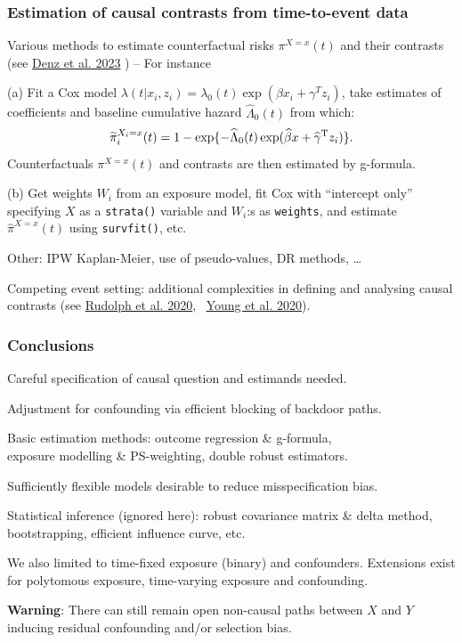 \documentclass[12pt,dvipsnames,t,aspectratio=169, handout%
]{beamer}
\begin{document}
\begin{frame}
\frametitle{\large Estimation of causal contrasts from time-to-event data}
\bi
\item
Various methods to estimate counterfactual %
risks $\pi^{X=x}(t)$ and their contrasts 
({\small see \href{https://doi.org/10.1002/sim.9681}{\color{blue}Denz et al. 2023} })
\pause
 -- For instance
\medskip
\item[(a)] 
Fit a Cox model $\lambda(t|x_i, z_i) = \lambda_0(t)\exp(\beta x_i + \gamma^{T}z_i)$,
take estimates of coefficients and baseline cumulative hazard $\widehat\Lambda_0(t)$
from which:
$$ %
 \widetilde{\pi}_i^{X_i=x}(t) = 1 - \exp \{ -\widehat\Lambda_0(t)\exp(\widehat\beta x + \widehat\gamma^{\small{\text{T}}} z_i) \}  .
$$ %
Counterfactuals $ {\pi}^{X=x}(t)$ and contrasts are then estimated by g-formula.
\pause
\medskip
\item[(b)]
Get weights $W_i$ from an exposure model, fit Cox with ``intercept only'' 
specifying $X$ as a \texttt{strata()} variable and $W_i$:s as \texttt{weights}, and estimate $\widehat{\pi}^{X=x}(t)$
using \texttt{survfit()}, etc.
\pause
\medskip
\item Other: IPW Kaplan-Meier, use of pseudo-values, DR methods, \dots
\medskip
\item Competing event setting: additional complexities in defining and analysing causal contrasts
({\small see \href{https://doi.org/10.1007/s40471-020-00240-7}{\color{blue}Rudolph et al. 2020}, \ 
\href{https://doi.org/10.1002/sim.8471}{\color{blue}Young et al. 2020}}).    
\ei
\end{frame}

\begin{frame}
\frametitle{\large Conclusions}

\bi
\item 
Careful specification of causal question and estimands needed.
\pause
\medskip
\item 
Adjustment for confounding via efficient blocking of backdoor paths.
\pause
\medskip
\item
Basic estimation methods: outcome regression \& g-formula, \\ 
exposure modelling \& PS-weighting, double robust estimators.
\pause 
\medskip
\item
Sufficiently flexible models desirable to reduce misspecification bias.
\pause
\medskip
\item 
Statistical inference (ignored here): robust covariance matrix \& delta method, bootstrapping,
efficient influence curve, etc.  
\pause
\medskip
\item
We also limited to time-fixed exposure (binary) and confounders.
Extensions exist for
 polytomous exposure, time-varying exposure and confounding.
 \pause
 \medskip
 \item
\textbf{Warning}: There can still remain open non-causal paths between $X$ and $Y$ 
inducing residual confounding and/or selection bias.
\ei

\end{frame}
\end{document}
